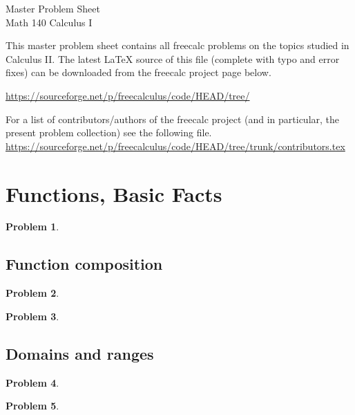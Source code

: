 \documentclass{article}
\newtheorem{problem}{Problem}
\begin{document}
\begin{center}
\Large
Master Problem Sheet \\ Math 140 Calculus I \\ 
\end{center}





This master problem sheet contains all freecalc problems on the topics studied in Calculus II. The latest \LaTeX{} source of this file (complete with typo and error fixes) can be downloaded from the freecalc project page below. 

\url{https://sourceforge.net/p/freecalculus/code/HEAD/tree/}

For a list of contributors/authors of the freecalc project (and in particular, the present problem collection) see the following file.
\url{https://sourceforge.net/p/freecalculus/code/HEAD/tree/trunk/contributors.tex}

\section{Functions, Basic Facts}
\begin{problem}

\end{problem}
\subsection{Function composition}
\begin{problem}

\end{problem}
\begin{problem}

\end{problem}
\subsection{Domains and ranges}
\begin{problem}

\end{problem}
\begin{problem}

\end{problem}
\end{document}
